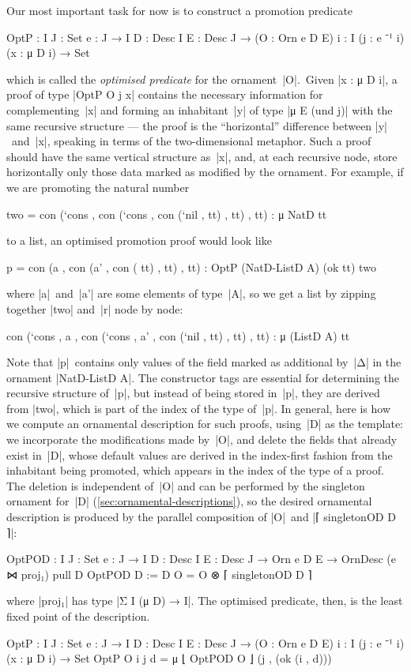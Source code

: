 Our most important task for now is to construct a promotion predicate
\begin{spec}
OptP :  {I J : Set} {e : J → I} {D : Desc I} {E : Desc J} →
        (O : Orn e D E) {i : I} (j : e ⁻¹ i) (x : μ D i) → Set
\end{spec}
which is called the \emph{optimised predicate} for the ornament~|O|.\
Given |x : μ D i|, a proof of type |OptP O j x| contains the necessary information for complementing~|x| and forming an inhabitant~|y| of type |μ E (und j)| with the same recursive structure --- the proof is the ``horizontal'' difference between |y|~and~|x|, speaking in terms of the two-dimensional metaphor.
Such a proof should have the same vertical structure as~|x|, and, at each recursive node, store horizontally only those data marked as modified by the ornament.
For example, if we are promoting the natural number
\begin{code}
two =  con (`cons  ,
       con (`cons  ,
       con (`nil   ,
         tt) , tt) , tt) : μ NatD tt
\end{code}
to a list, an optimised promotion proof would look like
\begin{code}
p =  con (a   ,
     con (a'  ,
     con (
       tt) , tt) , tt) : OptP (NatD-ListD A) (ok tt) two
\end{code}
where |a|~and~|a'| are some elements of type~|A|, so we get a list by zipping together |two| and~|r| node by node:
\begin{code}
con (`cons  , a   ,
con (`cons  , a'  ,
con (`nil   ,
  tt) , tt) , tt) : μ (ListD A) tt
\end{code}
Note that |p|~contains only values of the field marked as additional by~|Δ| in the ornament |NatD-ListD A|.
The constructor tags are essential for determining the recursive structure of~|p|, but instead of being stored in~|p|, they are derived from |two|, which is part of the index of the type of~|p|.
In general, here is how we compute an ornamental description for such proofs, using~|D| as the template:
we incorporate the modifications made by~|O|, and delete the fields that already exist in~|D|, whose default values are derived in the index-first fashion from the inhabitant being promoted, which appears in the index of the type of a proof.
The deletion is independent of~|O| and can be performed by the singleton ornament for~|D| (\autoref{sec:ornamental-descriptions}), so the desired ornamental description is produced by the parallel composition of |O|~and |⌈ singletonOD D ⌉|:
\begin{code}
OptPOD :  {I J : Set} {e : J → I} {D : Desc I} {E : Desc J} →
          Orn e D E → OrnDesc (e ⋈ proj₁) pull D
OptPOD {D := D} O = O ⊗ ⌈ singletonOD D ⌉
\end{code}
where |proj₁| has type |Σ I (μ D) → I|.
The optimised predicate, then, is the least fixed point of the description.
\begin{code}
OptP :  {I J : Set} {e : J → I} {D : Desc I} {E : Desc J} →
        (O : Orn e D E) {i : I} (j : e ⁻¹ i) (x : μ D i) → Set
OptP O {i} j d = μ ⌊ OptPOD O ⌋ (j , (ok (i , d)))
\end{code}

